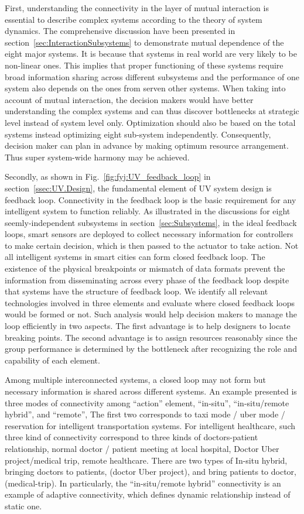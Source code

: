 \documentclass[letterpaper, twocolumn, 10pt, conference]{IEEEtran}
\begin{document}
First, understanding the connectivity in the layer of mutual interaction is essential to describe complex systems according to the theory of system dynamics. The comprehensive discussion have been presented in section~\ref{sec:InteractionSubsystems} to demonstrate mutual dependence of the eight major systems. It is because that systems in real world are very likely to be non-linear ones. This implies that proper functioning of these systems require broad information sharing across different subsystems and the performance of one system also depends on the ones from serven other systems. When taking into account of mutual interaction, the decision makers would have better understanding the complex systems and can thus discover bottlenecks at strategic level instead of system level only. Optimization should also be based on the total systems instead optimizing eight sub-system independently. Consequently, decision maker can plan in advance by making optimum resource arrangement. Thus super system-wide harmony may be achieved. 

Secondly, as shown in Fig.~\ref{fig:fyj:UV_feedback_loop} in section~\ref{ssec:UV.Design}, the fundamental element of UV system design is feedback loop. Connectivity in the feedback loop is the basic requirement for any intelligent system to function reliably. As illustrated in the discussions for eight seemly-independent subsystems in section~\ref{sec:Subsystems}, in the ideal feedback loops, smart sensors are deployed to collect necessary information for controllers to make certain decision, which is then passed to the actuator to take action. Not all intelligent systems in smart cities can form closed feedback loop. The existence of the physical breakpoints or mismatch of data formats prevent the information from disseminating across every phase of the feedback loop despite that systems have the structure of feedback loop. We identify all relevant technologies involved in three elements and evaluate where closed feedback loops would be formed or not. Such analysis would help decision makers to manage the loop efficiently in two aspects. The first advantage is to help designers to locate breaking points. The second advantage is to assign resources reasonably since the group performance is determined by the bottleneck after recognizing the role and capability of each element. 

Among multiple interconnected systems, a closed loop may not form but necessary information is shared across different systems. An example presented is three modes of connectivity among \enquote{action} element, \enquote{in-situ}, \enquote{in-situ/remote hybrid}, and \enquote{remote}, The first two corresponds to taxi mode / uber mode / reservation for intelligent transportation systems. For intelligent healthcare, such three kind of connectivity correspond to three kinds of doctors-patient relationship, normal doctor / patient meeting at local hospital, Doctor Uber project/medical trip, remote healthcare. There are two types of In-situ hybrid, bringing doctors to patients, (doctor Uber project), and bring patients to doctor, (medical-trip). In particularly, the \enquote{in-situ/remote hybrid} connectivity is an example of adaptive connectivity, which defines dynamic relationship instead of static one. 
\end{document}

